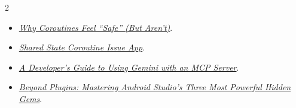 \documentclass[10pt,a4paper,withhyper]{altacv}
\begin{document}
\begin{paracol}{2}





\begin{itemize}

	\item 	\href{https://medium.com/@slimaniiyassine/why-coroutines-feel-safe-but-arent-582a31ebe0d3}{\textit{Why Coroutines Feel “Safe” (But Aren’t)}}.
		
		\item	\href{https://github.com/slimaniiyassine/Medium-Article-Shared-State-Coroutine-Issue}{\textit{Shared State Coroutine Issue App}}.
		
	\item	\href{https://medium.com/@slimaniiyassine/a-developers-guide-to-using-gemini-with-an-mcp-server-05878c418097}{\textit{A Developer’s Guide to Using Gemini with an MCP Server}}.
	
	\item	\href{https://medium.com/@slimaniiyassine/beyond-plugins-mastering-android-studios-three-most-powerful-hidden-gems-b8210bbb0e89}{\textit{Beyond Plugins: Mastering Android Studio’s Three Most Powerful Hidden Gems}}.
	
\end{itemize}



\end{paracol}
\end{document}
